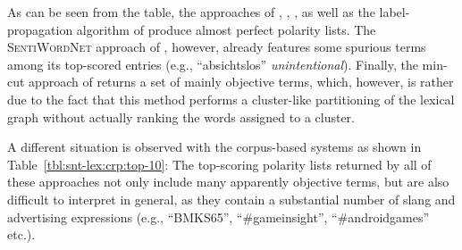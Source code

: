 As can be seen from the table, the approaches of \citet{Hu:04},
\citet{Blair-Goldensohn:08}, \citet{Kim:04}, as well as the
label-propagation algorithm of \citet{Rao:09} produce almost perfect
polarity lists.  The \textsc{SentiWordNet} approach of
\citet{Esuli:06c}, however, already features some spurious terms among
its top-scored entries (e.g., ``absichtslos'' \emph{unintentional}).
Finally, the min-cut approach of \citet{Rao:09} returns a set of
mainly objective terms, which, however, is rather due to the fact that
this method performs a cluster-like partitioning of the lexical graph
without actually ranking the words assigned to a cluster.

A different situation is observed with the corpus-based systems as
shown in Table~\ref{tbl:snt-lex:crp:top-10}: The top-scoring polarity
lists returned by all of these approaches not only include many
apparently objective terms, but are also difficult to interpret in
general, as they contain a substantial number of slang and advertising
expressions (e.g., ``BMKS65'', ``\#gameinsight'', ``\#androidgames''
etc.).

